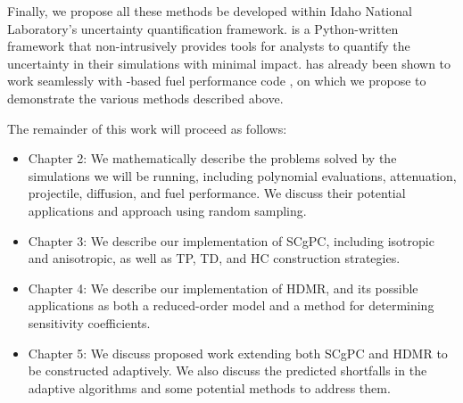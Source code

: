 Finally, we propose all these methods be developed within Idaho National Laboratory's \raven{}\cite{raven}
uncertainty quantification framework. \raven{} is a Python-written framework that non-intrusively provides
tools for analysts to quantify the uncertainty in their simulations with minimal impact. \raven{}  has already
been shown to work seamlessly with \moose{}-based fuel performance code \bison{}\cite{moose}\cite{bison}, on which we propose to demonstrate the various
methods described above.

The remainder of this work will proceed as follows:
\begin{itemize}
  \item Chapter 2: We mathematically describe the problems solved by the simulations we will be running,
    including polynomial evaluations, attenuation, projectile, diffusion, and fuel performance.  We discuss
    their potential applications and approach using random sampling.
  \item Chapter 3: We describe our implementation of SCgPC, including isotropic and anisotropic, as well as
    TP, TD, and HC construction strategies.
  \item Chapter 4: We describe our implementation of HDMR, and its possible applications as both a
    reduced-order model and a method for determining sensitivity coefficients.
  \item Chapter 5: We discuss proposed work extending both SCgPC and HDMR to be constructed adaptively.  We
    also discuss the predicted shortfalls in the adaptive algorithms and some potential methods to address
    them.
\end{itemize}
